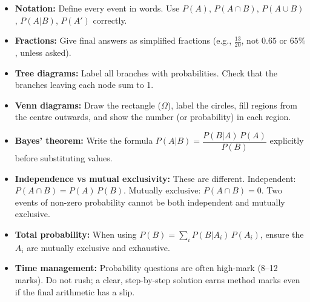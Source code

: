 \documentclass[11pt]{article}
\begin{document}
\begin{aretenir}
\begin{itemize}
    \item \textbf{Notation:} Define every event in words. Use $P(A)$, $P(A \cap B)$, $P(A \cup B)$, $P(A|B)$, $P(A')$ correctly.
    \item \textbf{Fractions:} Give final answers as simplified fractions (e.g., $\frac{13}{20}$, not $0.65$ or $65\%$, unless asked).
    \item \textbf{Tree diagrams:} Label all branches with probabilities. Check that the branches leaving each node sum to 1.
    \item \textbf{Venn diagrams:} Draw the rectangle ($\Omega$), label the circles, fill regions from the centre outwards, and show the number (or probability) in each region.
    \item \textbf{Bayes' theorem:} Write the formula $P(A|B) = \dfrac{P(B|A)\,P(A)}{P(B)}$ explicitly before substituting values.
    \item \textbf{Independence vs mutual exclusivity:} These are different. Independent: $P(A \cap B)=P(A)\,P(B)$. Mutually exclusive: $P(A \cap B)=0$. Two events of non-zero probability cannot be both independent and mutually exclusive.
    \item \textbf{Total probability:} When using $P(B) = \sum_i P(B|A_i)\,P(A_i)$, ensure the $A_i$ are mutually exclusive and exhaustive.
    \item \textbf{Time management:} Probability questions are often high-mark (8--12 marks). Do not rush; a clear, step-by-step solution earns method marks even if the final arithmetic has a slip.
\end{itemize}
\end{aretenir}
\end{document}
